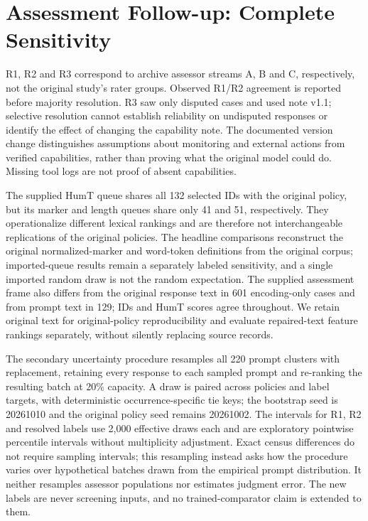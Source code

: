 \documentclass[manuscript,screen,review,anonymous]{acmart}
\begin{document}
\section{Assessment Follow-up: Complete Sensitivity}\label{app:assessment}
R1, R2 and R3 correspond to archive assessor streams A, B and C, respectively, not the original study's rater groups. Observed R1/R2 agreement is reported before majority resolution. R3 saw only disputed cases and used note v1.1; selective resolution cannot establish reliability on undisputed responses or identify the effect of changing the capability note. The documented version change distinguishes assumptions about monitoring and external actions from verified capabilities, rather than proving what the original model could do. Missing tool logs are not proof of absent capabilities.





The supplied HumT queue shares all 132 selected IDs with the original policy, but its marker and length queues share only 41 and 51, respectively. They operationalize different lexical rankings and are therefore not interchangeable replications of the original policies. The headline comparisons reconstruct the original normalized-marker and word-token definitions from the original corpus; imported-queue results remain a separately labeled sensitivity, and a single imported random draw is not the random expectation. The supplied assessment frame also differs from the original response text in 601 encoding-only cases and from prompt text in 129; IDs and HumT scores agree throughout. We retain original text for original-policy reproducibility and evaluate repaired-text feature rankings separately, without silently replacing source records.

The secondary uncertainty procedure resamples all 220 prompt clusters with replacement, retaining every response to each sampled prompt and re-ranking the resulting batch at 20\% capacity. A draw is paired across policies and label targets, with deterministic occurrence-specific tie keys; the bootstrap seed is 20261010 and the original policy seed remains 20261002. The intervals for R1, R2 and resolved labels use 2,000 effective draws each and are exploratory pointwise percentile intervals without multiplicity adjustment. Exact census differences do not require sampling intervals; this resampling instead asks how the procedure varies over hypothetical batches drawn from the empirical prompt distribution. It neither resamples assessor populations nor estimates judgment error. The new labels are never screening inputs, and no trained-comparator claim is extended to them.
\end{document}
